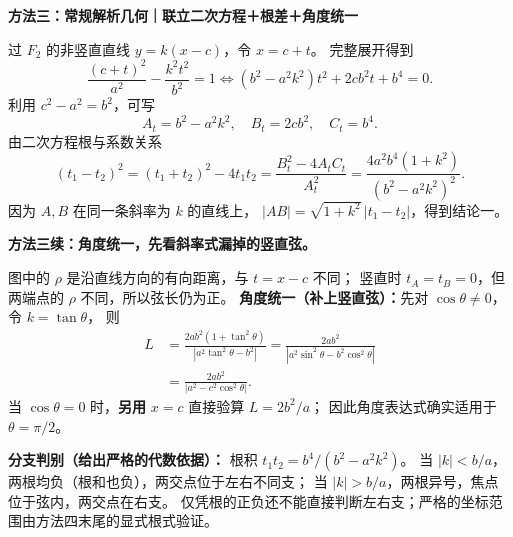 \clearpage
\begin{proofbox}
\textbf{方法三：常规解析几何｜联立二次方程＋根差＋角度统一}
\begin{center}\end{center}

过 $F_2$ 的非竖直直线 $y=k(x-c)$，令 $x=c+t$。
完整展开得到
\[
\frac{(c+t)^2}{a^2}-\frac{k^2t^2}{b^2}=1
\iff (b^2-a^2k^2)t^2+2cb^2t+b^4=0.
\]
利用 $c^2-a^2=b^2$，可写
\[
A_t=b^2-a^2k^2,\quad B_t=2cb^2,\quad C_t=b^4.
\]
由二次方程根与系数关系
\[
(t_1-t_2)^2=(t_1+t_2)^2-4t_1t_2
=\frac{B_t^2-4A_tC_t}{A_t^2}
=\frac{4a^2b^4(1+k^2)}{(b^2-a^2k^2)^2}.
\]
因为 $A,B$ 在同一条斜率为 $k$ 的直线上，
$|AB|=\sqrt{1+k^2}\,|t_1-t_2|$，得到结论一。

\tcbbreak
\textbf{方法三续：角度统一，先看斜率式漏掉的竖直弦。}
\begin{center}\end{center}
图中的 $\rho$ 是沿直线方向的有向距离，与 $t=x-c$ 不同；
竖直时 $t_A=t_B=0$，但两端点的 $\rho$ 不同，所以弦长仍为正。
\textbf{角度统一（补上竖直弦）：}先对 $\cos\theta\ne0$，令 $k=\tan\theta$，
则
\[
\begin{aligned}
L&=\frac{2ab^2(1+\tan^2\theta)}{|a^2\tan^2\theta-b^2|}
=\frac{2ab^2}{|a^2\sin^2\theta-b^2\cos^2\theta|}\\
&=\boxed{\frac{2ab^2}{|a^2-c^2\cos^2\theta|}}.
\end{aligned}
\]
当 $\cos\theta=0$ 时，\textbf{另用} $x=c$ 直接验算 $L=2b^2/a$；
因此角度表达式确实适用于 $\theta=\pi/2$。

\textbf{分支判别（给出严格的代数依据）：}
根积 $t_1t_2=b^4/(b^2-a^2k^2)$。
当 $|k|<b/a$，两根均负（根和也负），两交点位于左右不同支；
当 $|k|>b/a$，两根异号，焦点位于弦内，两交点在右支。
仅凭根的正负还不能直接判断左右支；严格的坐标范围由方法四末尾的显式根式验证。
\end{proofbox}

